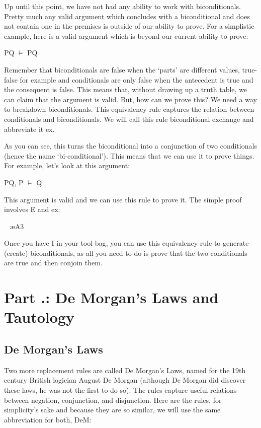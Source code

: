 Up until this point, we have not had any ability to work with biconditionals. Pretty much any valid argument which concludes with a biconditional and does not contain one in the premises is outside of our ability to prove. For a simplistic example, here is a valid argument which is beyond our current ability to prove: 
\begin{center}
P\eiff Q $\vDash$ P\eif Q
\end{center}
Remember that biconditionals are false when the `parts' are different values, true-false for example and conditionals are only false when the antecedent is true and the consequent is false. This means that, without drawing up a truth table, we can claim that the argument is valid. But, how can we prove this? We need a way to breakdown biconditionals. This equivalency rule captures the relation between conditionals and biconditionals. We will call this rule biconditional exchange and abbreviate it \eiff ex.

As you can see, this turns the biconditional into a conjunction of two conditionals (hence the name `bi-conditional'). This means that we can use it to prove things. For example, let's look at this argument:
\begin{center}
P\eiff Q, P $\vDash$ Q
\end{center}
This argument is valid and we can use this rule to prove it. The simple proof involves \eif E and \eiff ex:
\begin{fitchproof}
 	
\ae{A3}	
\end{fitchproof}

Once you have \eif I in your tool-bag, you can use this equivalency rule to generate (create) biconditionals, as all you need to do is prove that the two conditionals are true and then conjoin them.
\section{Part \thechapcount.\theseccount: De Morgan's Laws and Tautology}
\subsection{De Morgan's Laws}
Two more replacement rules are called De Morgan's Laws, named for the 19th century British logician August De Morgan (although De Morgan did discover these laws, he was not the first to do so). The rules capture useful relations between negation, conjunction, and disjunction. Here are the rules, for simplicity's sake and because they are so similar, we will use the same abbreviation for both, DeM:

